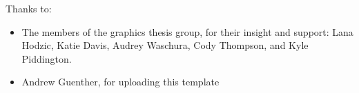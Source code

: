 \noindent
Thanks to:
\begin{itemize}
	\item The members of the graphics thesis group, for their insight and support: Lana Hodzic, Katie Davis, Audrey Waschura, Cody Thompson, and Kyle Piddington.
	\item Andrew Guenther, for uploading this template
\end{itemize}

